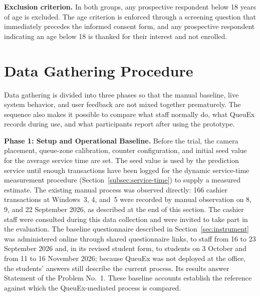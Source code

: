 \documentclass{research}
\newcommand{\sysname}{QueuEx}
\begin{document}
\textbf{Exclusion criterion.} In both groups, any prospective
respondent below 18 years of age is excluded. The age criterion is
enforced through a screening question that immediately precedes the
informed consent form, and any prospective respondent indicating an age
below 18 is thanked for their interest and not enrolled.

\section{Data Gathering Procedure}
\label{sec:datagathering}

Data gathering is divided into three phases so that the manual
baseline, live system behavior, and user feedback are not mixed
together prematurely. The sequence also makes it possible to compare
what staff normally do, what \sysname{} records during use, and what
participants report after using the prototype.

\textbf{Phase 1: Setup and Operational Baseline.} Before the trial, the
camera placement, queue-zone calibration, counter configuration, and
initial seed value for the average service time are set. The seed value
is used by the prediction service until enough
transactions have been logged for the dynamic service-time measurement
procedure (Section~\ref{subsec:service-time}) to supply a measured
estimate. The existing manual process was observed directly: 166 cashier
transactions at Windows~3, 4, and~5 were recorded by manual observation
on 8, 9, and 22 September 2026, as described at the end of this
section. The cashier staff were consulted during this data collection
and were invited to take part in the evaluation. The baseline questionnaire described in
Section~\ref{sec:instrument} was administered online through shared
questionnaire links, to staff from 16 to 23 September 2026 and, in its
revised student form, to students on 3 October and from 11 to 16
November 2026; because \sysname{} was not deployed at the office, the
students' answers still describe the current process. Its results
answer Statement of the Problem No.~1. These baseline accounts establish
the reference against which the \sysname{}-mediated process is
compared.
\end{document}
